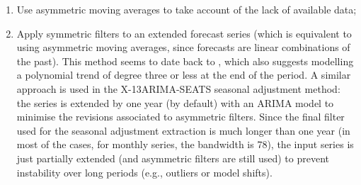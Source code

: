 \documentclass[
]{article}
\newcommand\1{\mathds{1}}
\begin{document}
\begin{enumerate}
\def\labelenumi{\arabic{enumi}.}
\item
  Use asymmetric moving averages to take account of the lack of
  available data;
\item
  Apply symmetric filters to an extended forecast series (which is
  equivalent to using asymmetric moving averages, since forecasts are
  linear combinations of the past). This method seems to date back to
  \textcite{deforest1877adjustment}, which also suggests modelling a
  polynomial trend of degree three or less at the end of the period. A
  similar approach is used in the X-13ARIMA-SEATS seasonal adjustment
  method: the series is extended by one year (by default) with an ARIMA
  model to minimise the revisions associated to asymmetric filters.
  Since the final filter used for the seasonal adjustment extraction is
  much longer than one year (in most of the cases, for monthly series,
  the bandwidth is 78), the input series is just partially extended (and
  asymmetric filters are still used) to prevent instability over long
  periods (e.g., outliers or model shifts).
\end{enumerate}
\end{document}
